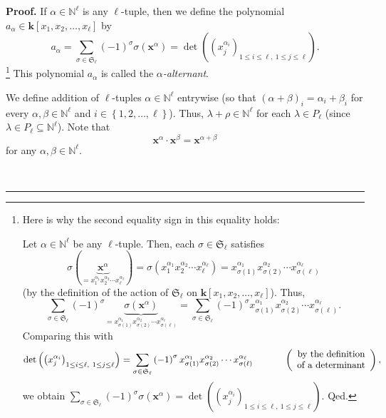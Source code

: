 \documentclass[numbers=enddot,12pt,final,onecolumn,notitlepage]{scrartcl}%
\theoremstyle{definition}
\newenvironment{proof}[1][Proof]{\noindent\textbf{#1.} }{\ \rule{0.5em}{0.5em}}
\let\sumnonlimits\sum
\renewcommand{\sum}{\sumnonlimits\limits}
\newenvironment{verlong}{}{}
\begin{document}
\begin{verlong}
\begin{proof}
If $\alpha\in\mathbb{N}^{\ell}$ is any $\ell$-tuple, then we define the
polynomial $a_{\alpha}\in\mathbf{k}\left[  x_{1},x_{2},\ldots,x_{\ell}\right]
$ by%
\[
a_{\alpha}=\sum_{\sigma\in\mathfrak{S}_{\ell}}\left(  -1\right)  ^{\sigma
}\sigma\left(  \mathbf{x}^{\alpha}\right)  =\det\left(  \left(  x_{j}%
^{\alpha_{i}}\right)  _{1\leq i\leq\ell,\ 1\leq j\leq\ell}\right)  .
\]
\footnote{Here is why the second equality sign in this equality holds:
\par
Let $\alpha\in\mathbb{N}^{\ell}$ be any $\ell$-tuple. Then, each $\sigma
\in\mathfrak{S}_{\ell}$ satisfies%
\[
\sigma\left(  \underbrace{\mathbf{x}^{\alpha}}_{=x_{1}^{\alpha_{1}}%
x_{2}^{\alpha_{2}}\cdots x_{\ell}^{\alpha_{\ell}}}\right)  =\sigma\left(
x_{1}^{\alpha_{1}}x_{2}^{\alpha_{2}}\cdots x_{\ell}^{\alpha_{\ell}}\right)
=x_{\sigma\left(  1\right)  }^{\alpha_{1}}x_{\sigma\left(  2\right)  }%
^{\alpha_{2}}\cdots x_{\sigma\left(  \ell\right)  }^{\alpha_{\ell}}%
\]
(by the definition of the action of $\mathfrak{S}_{\ell}$ on $\mathbf{k}%
\left[  x_{1},x_{2},\ldots,x_{\ell}\right]  $). Thus,%
\[
\sum_{\sigma\in\mathfrak{S}_{\ell}}\left(  -1\right)  ^{\sigma}%
\underbrace{\sigma\left(  \mathbf{x}^{\alpha}\right)  }_{=x_{\sigma\left(
1\right)  }^{\alpha_{1}}x_{\sigma\left(  2\right)  }^{\alpha_{2}}\cdots
x_{\sigma\left(  \ell\right)  }^{\alpha_{\ell}}}=\sum_{\sigma\in
\mathfrak{S}_{\ell}}\left(  -1\right)  ^{\sigma}x_{\sigma\left(  1\right)
}^{\alpha_{1}}x_{\sigma\left(  2\right)  }^{\alpha_{2}}\cdots x_{\sigma\left(
\ell\right)  }^{\alpha_{\ell}}.
\]
Comparing this with%
\[
\det\left(  \left(  x_{j}^{\alpha_{i}}\right)  _{1\leq i\leq\ell,\ 1\leq
j\leq\ell}\right)  =\sum_{\sigma\in\mathfrak{S}_{\ell}}\left(  -1\right)
^{\sigma}x_{\sigma\left(  1\right)  }^{\alpha_{1}}x_{\sigma\left(  2\right)
}^{\alpha_{2}}\cdots x_{\sigma\left(  \ell\right)  }^{\alpha_{\ell}%
}\ \ \ \ \ \ \ \ \ \ \left(
\begin{array}
[c]{c}%
\text{by the definition}\\
\text{of a determinant}%
\end{array}
\right)  ,
\]
we obtain $\sum_{\sigma\in\mathfrak{S}_{\ell}}\left(  -1\right)  ^{\sigma
}\sigma\left(  \mathbf{x}^{\alpha}\right)  =\det\left(  \left(  x_{j}%
^{\alpha_{i}}\right)  _{1\leq i\leq\ell,\ 1\leq j\leq\ell}\right)  $. Qed.}
This polynomial $a_{\alpha}$ is called the $\alpha$\emph{-alternant}.

We define addition of $\ell$-tuples $\alpha\in\mathbb{N}^{\ell}$ entrywise (so
that $\left(  \alpha+\beta\right)  _{i}=\alpha_{i}+\beta_{i}$ for every
$\alpha,\beta\in\mathbb{N}^{\ell}$ and $i\in\left\{  1,2,\ldots,\ell\right\}
$). Thus, $\lambda+\rho\in\mathbb{N}^{\ell}$ for each $\lambda\in P_{\ell}$
(since $\lambda\in P_{\ell}\subseteq\mathbb{N}^{\ell}$). Note that
\begin{equation}
\mathbf{x}^{\alpha}\cdot\mathbf{x}^{\beta}=\mathbf{x}^{\alpha+\beta}
\label{pf.thm.G.pieri.xaxb}%
\end{equation}
for any $\alpha,\beta\in\mathbb{N}^{\ell}$.


\end{proof}
\end{verlong}
\end{document}
